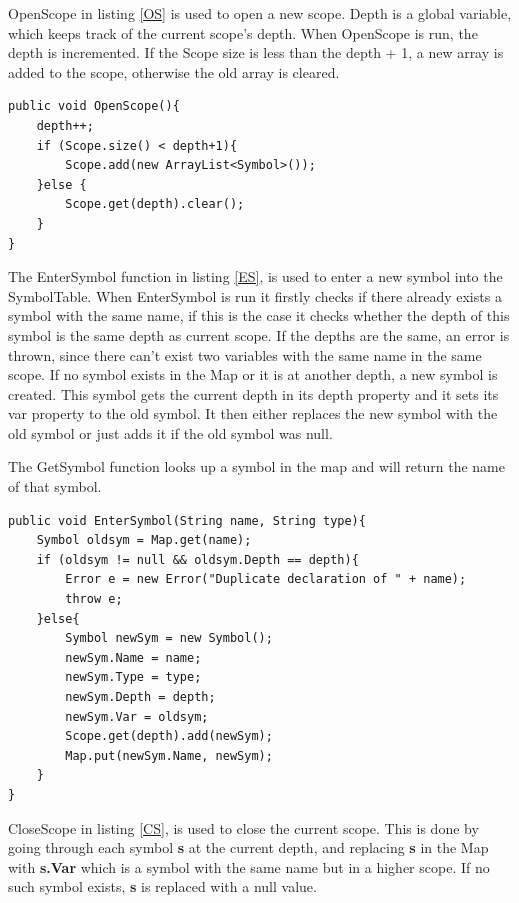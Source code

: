 OpenScope in listing \ref{OS} is used to open a new scope. Depth is a global variable, which keeps track of the current scope's depth. When OpenScope is run, the depth is incremented. If the Scope size is less than the depth + 1, a new array is added to the scope, otherwise the old array is cleared.

\begin{lstlisting}[caption={OpenScope function}, label={OS}]
public void OpenScope(){
    depth++;
    if (Scope.size() < depth+1){
        Scope.add(new ArrayList<Symbol>());
    }else {
        Scope.get(depth).clear();
    }
}
\end{lstlisting}

 The EnterSymbol function in listing \ref{ES}, is used to enter a new symbol into the SymbolTable. When EnterSymbol is run it firstly checks if there already exists a symbol with the same name, if this is the case it checks whether the depth of this symbol is the same depth as current scope. If the depths are the same, an error is thrown, since there can't exist two variables with the same name in the same scope. If no symbol exists in the Map or it is at another depth, a new symbol is created. This symbol gets the current depth in its depth property and it sets its var property to the old symbol. It then either replaces the new symbol with the old symbol or just adds it if the old symbol was null. 

The GetSymbol function looks up a symbol in the map and will return the name of that symbol.

\begin{lstlisting}[caption={EnterSymbol function}, label={ES}]
public void EnterSymbol(String name, String type){
    Symbol oldsym = Map.get(name);
    if (oldsym != null && oldsym.Depth == depth){
        Error e = new Error("Duplicate declaration of " + name);
        throw e;
    }else{
        Symbol newSym = new Symbol();
        newSym.Name = name;
        newSym.Type = type;
        newSym.Depth = depth;
        newSym.Var = oldsym;
        Scope.get(depth).add(newSym);
        Map.put(newSym.Name, newSym);
    }
}
\end{lstlisting}

CloseScope in listing \ref{CS}, is used to close the current scope. This is done by going through each symbol \textbf{s} at the current depth, and replacing \textbf{s} in the Map with \textbf{s.Var} which is a symbol with the same name but in a higher scope. If no such symbol exists, \textbf{s} is replaced with a null value. 

